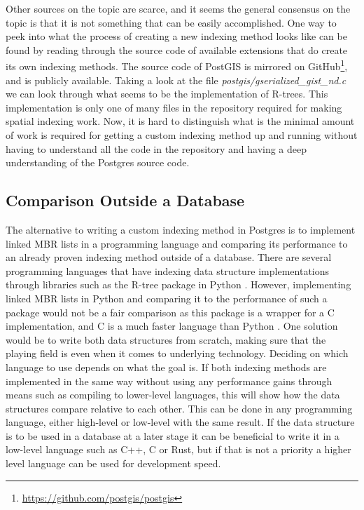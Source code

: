 Other sources on the topic are scarce, and it seems the general consensus on the topic is that it is not something that can be easily accomplished. One way to peek into what the process of creating a new indexing method looks like can be found by reading through the source code of available extensions that do create its own indexing methods. The source code of PostGIS is mirrored on GitHub\footnote{\url{https://github.com/postgis/postgis}}, and is publicly available. Taking a look at the file \textit{postgis/gserialized\_gist\_nd.c} we can look through what seems to be the implementation of R-trees. This implementation is only one of many files in the repository required for making spatial indexing work. Now, it is hard to distinguish what is the minimal amount of work is required for getting a custom indexing method up and running without having to understand all the code in the repository and having a deep understanding of the Postgres source code.

\subsection{Comparison Outside a Database}
The alternative to writing a custom indexing method in Postgres is to implement linked MBR lists in a programming language and comparing its performance to an already proven indexing method outside of a database. There are several programming languages that have indexing data structure implementations through libraries such as the R-tree package in Python \cite{python_r_tree}. However, implementing linked MBR lists in Python and comparing it to the performance of such a package would not be a fair comparison as this package is a wrapper for a C implementation, and C is a much faster language than Python \cite{cython}. One solution would be to write both data structures from scratch, making sure that the playing field is even when it comes to underlying technology. Deciding on which language to use depends on what the goal is. If both indexing methods are implemented in the same way without using any performance gains through means such as compiling to lower-level languages, this will show how the data structures compare relative to each other. This can be done in any programming language, either high-level or low-level with the same result. If the data structure is to be used in a database at a later stage it can be beneficial to write it in a low-level language such as C++, C or Rust, but if that is not a priority a higher level language can be used for development speed. \\

